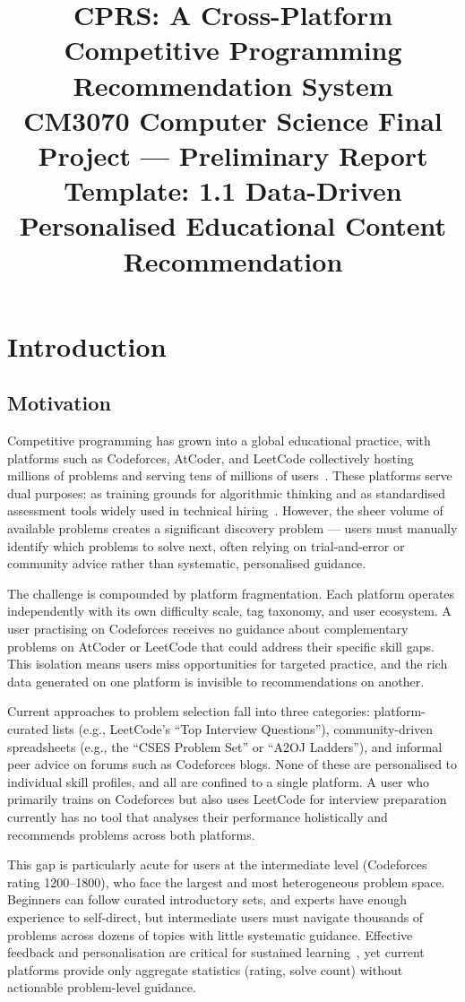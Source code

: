 \documentclass[12pt,a4paper]{article}
\title{\textbf{CPRS: A Cross-Platform Competitive Programming Recommendation System} \\[1em]
\large CM3070 Computer Science Final Project --- Preliminary Report \\[0.5em]
\large Template: 1.1 Data-Driven Personalised Educational Content Recommendation}
\author{}
\date{}
\begin{document}
\maketitle

\section{Introduction}

\subsection{Motivation}

Competitive programming has grown into a global educational practice, with platforms such as Codeforces, AtCoder, and LeetCode collectively hosting millions of problems and serving tens of millions of users~\cite{wasik2018}. These platforms serve dual purposes: as training grounds for algorithmic thinking and as standardised assessment tools widely used in technical hiring~\cite{liang2021}. However, the sheer volume of available problems creates a significant discovery problem --- users must manually identify which problems to solve next, often relying on trial-and-error or community advice rather than systematic, personalised guidance.

The challenge is compounded by platform fragmentation. Each platform operates independently with its own difficulty scale, tag taxonomy, and user ecosystem. A user practising on Codeforces receives no guidance about complementary problems on AtCoder or LeetCode that could address their specific skill gaps. This isolation means users miss opportunities for targeted practice, and the rich data generated on one platform is invisible to recommendations on another.

Current approaches to problem selection fall into three categories: platform-curated lists (e.g., LeetCode's ``Top Interview Questions''), community-driven spreadsheets (e.g., the ``CSES Problem Set'' or ``A2OJ Ladders''), and informal peer advice on forums such as Codeforces blogs. None of these are personalised to individual skill profiles, and all are confined to a single platform. A user who primarily trains on Codeforces but also uses LeetCode for interview preparation currently has no tool that analyses their performance holistically and recommends problems across both platforms.

This gap is particularly acute for users at the intermediate level (Codeforces rating 1200--1800), who face the largest and most heterogeneous problem space. Beginners can follow curated introductory sets, and experts have enough experience to self-direct, but intermediate users must navigate thousands of problems across dozens of topics with little systematic guidance. Effective feedback and personalisation are critical for sustained learning~\cite{boud2013}, yet current platforms provide only aggregate statistics (rating, solve count) without actionable problem-level guidance.
\end{document}

